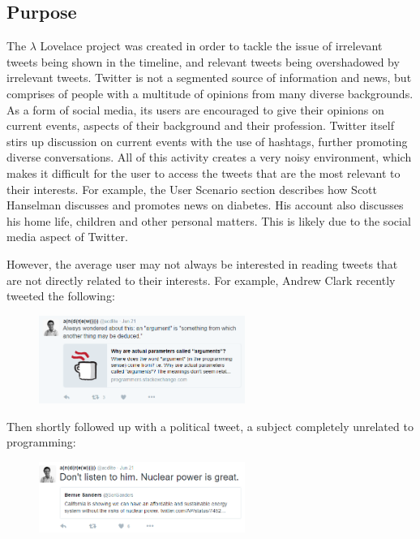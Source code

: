 \documentclass{article}
\begin{document}
\subsection{Purpose}
The $\lambda$ Lovelace project was created in order to tackle the issue of irrelevant tweets being shown in the timeline, and relevant tweets being overshadowed by irrelevant tweets. Twitter is not a segmented source of information and news, but comprises of people with a multitude of opinions from many diverse backgrounds. As a form of social media, its users are encouraged to give their opinions on current events, aspects of their background and their profession. Twitter itself stirs up discussion on current events with the use of hashtags, further promoting diverse conversations. All of this activity creates a very noisy environment, which makes it difficult for the user to access the tweets that are the most relevant to their interests. For example, the User Scenario section describes how Scott Hanselman discusses and promotes news on diabetes. His account also discusses his home life, children and other personal matters. This is likely due to the social media aspect of Twitter. 

However, the average user may not always be interested in reading tweets that are not directly related to their interests. For example, Andrew Clark recently tweeted the following\cite{clark1}:

\begin{figure}[H]
    \includegraphics[width=0.6\textwidth, center]{clark1}
\end{figure}

Then shortly followed up with a political tweet, a subject completely unrelated to programming\cite{clark2}:

\begin{figure}[H]
    \includegraphics[width=0.6\textwidth, center]{clark2}
\end{figure}
\end{document}
